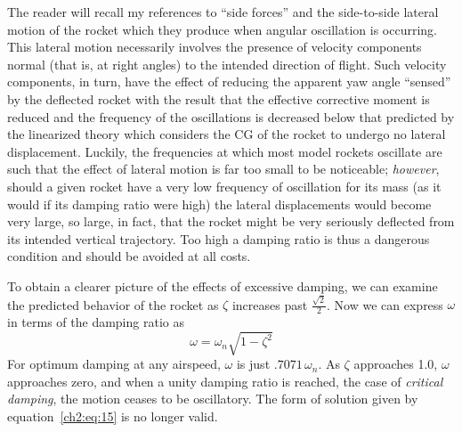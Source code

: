 The reader will recall my references to ``side forces'' and the side-to-side
lateral motion of the rocket which they produce when angular oscillation is
occurring. This lateral motion necessarily involves the presence of velocity
components normal (that is, at right angles) to the intended direction of
flight. Such velocity components, in turn, have the effect of reducing the
apparent yaw angle ``sensed'' by the deflected rocket with the result that the
effective corrective moment is reduced and the frequency of the oscillations is
decreased below that predicted by the linearized theory which considers the CG
of the rocket to undergo no lateral displacement. Luckily, the frequencies at
which most model rockets oscillate are such that the effect of lateral motion
is far too small to be noticeable; \emph{however}, should a given rocket have a
very low frequency of oscillation for its mass (as it would if its damping
ratio were high) the lateral displacements would become very large, so large,
in fact, that the rocket might be very seriously deflected from its intended
vertical trajectory. Too high a damping ratio is thus a dangerous condition and
should be avoided at all costs.

To obtain a clearer picture of the effects of excessive damping, we can examine
the predicted behavior of the rocket as $\zeta$ increases past
$\frac{\sqrt{2}}{2}$. Now we can express $\omega$ in terms of the damping ratio
as
\begin{equation*}
\omega = \omega_n\sqrt{1 - \zeta^{2}}
\end{equation*}
For optimum damping at any airspeed, $\omega$ is just $.7071\,\omega_n$. As
$\zeta$ approaches 1.0, $\omega$ approaches zero, and when a unity damping
ratio is reached, the case of \emph{critical damping}, the motion ceases to be
oscillatory. The form of solution given by equation~\eqref{ch2:eq:15} is no
longer valid.

